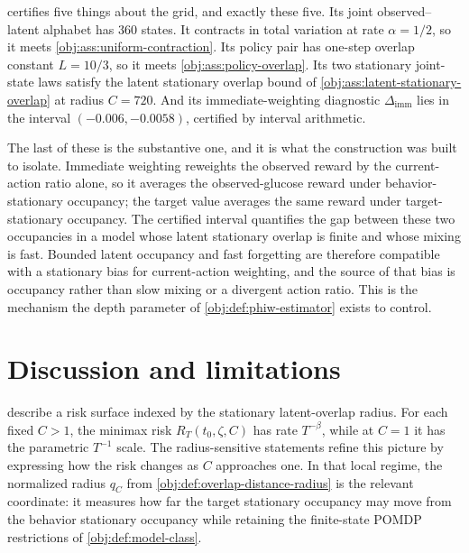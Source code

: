 \documentclass[11pt]{article}
\begin{document}
 certifies five things about the grid, and exactly these five. Its joint observed--latent alphabet has \(360\) states. It contracts in total variation at rate \(\alpha=1/2\), so it meets \cref{obj:ass:uniform-contraction}. Its policy pair has one-step overlap constant \(L=10/3\), so it meets \cref{obj:ass:policy-overlap}. Its two stationary joint-state laws satisfy the latent stationary overlap bound of \cref{obj:ass:latent-stationary-overlap} at radius \(C=720\). And its immediate-weighting diagnostic \(\Delta_{\mathrm{imm}}\) lies in the interval \((-0.006,-0.0058)\), certified by interval arithmetic.

The last of these is the substantive one, and it is what the construction was built to isolate. Immediate weighting reweights the observed reward by the current-action ratio alone, so it averages the observed-glucose reward under behavior-stationary occupancy; the target value averages the same reward under target-stationary occupancy. The certified interval quantifies the gap between these two occupancies in a model whose latent stationary overlap is finite and whose mixing is fast. Bounded latent occupancy and fast forgetting are therefore compatible with a stationary bias for current-action weighting, and the source of that bias is occupancy rather than slow mixing or a divergent action ratio. This is the mechanism the depth parameter of \cref{obj:def:phiw-estimator} exists to control.


\section{Discussion and limitations}

 describe a risk surface indexed by the stationary latent-overlap radius. For each fixed \(C>1\), the minimax risk \(R_T(t_0,\zeta,C)\) has rate \(T^{-\beta}\), while at \(C=1\) it has the parametric \(T^{-1}\) scale. The radius-sensitive statements refine this picture by expressing how the risk changes as \(C\) approaches one. In that local regime, the normalized radius \(q_C\) from \cref{obj:def:overlap-distance-radius} is the relevant coordinate: it measures how far the target stationary occupancy may move from the behavior stationary occupancy while retaining the finite-state POMDP restrictions of \cref{obj:def:model-class}.
\end{document}
